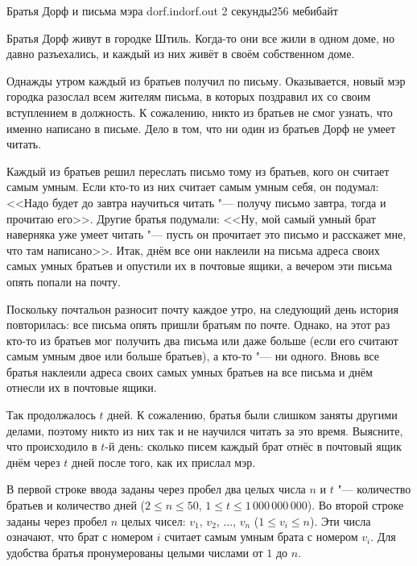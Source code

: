 \gdef\thisproblemauthor{Иван Казменко}
\gdef\thisproblemdeveloper{Иван Казменко}
\begin{problem}{Братья Дорф и письма мэра}
{dorf.in}{dorf.out}
{2 секунды}{256 мебибайт}{}

Братья Дорф живут в городке Штиль.
Когда-то они все жили в одном доме, но давно разъехались,
и каждый из них живёт в своём собственном доме.

Однажды утром каждый из братьев получил по письму.
Оказывается, новый мэр городка разослал всем жителям письма,
в которых поздравил их со своим вступлением в должность.
К сожалению, никто из братьев не смог узнать, что именно написано в письме.
Дело в том, что ни один из братьев Дорф не умеет читать.

Каждый из братьев решил переслать письмо тому из братьев,
кого он считает самым умным.
Если кто-то из них считает самым умным себя, он подумал:
<<Надо будет до завтра научиться читать "--- получу письмо завтра,
тогда и прочитаю его>>.
Другие братья подумали:
<<Ну, мой самый умный брат наверняка уже умеет читать "--- пусть он
прочитает это письмо и расскажет мне, что там написано>>.
Итак, днём все они наклеили на письма адреса своих самых умных братьев
и опустили их в почтовые ящики, а вечером эти письма опять попали на почту.

Поскольку почтальон разносит почту каждое утро, на следующий день
история повторилась: все письма опять пришли братьям по почте.
Однако, на этот раз кто-то из братьев мог получить два письма
или даже больше (если его считают самым умным двое или больше братьев),
а кто-то "--- ни одного.
Вновь все братья наклеили адреса своих самых умных братьев на все письма
и днём отнесли их в почтовые ящики.

Так продолжалось $t$ дней.
К сожалению, братья были слишком заняты другими делами, поэтому
никто из них так и не научился читать за это время.
Выясните, что происходило в $t$-й день: сколько писем каждый брат
отнёс в почтовый ящик днём через $t$ дней после того, как их прислал мэр.

\ifdefined\newpageafterlegend\newpage\fi

\InputFile

В первой строке ввода заданы через пробел два целых числа $n$ и $t$ "---
количество братьев и количество дней
($2 \le n \le 50$, $1 \le t \le 1\,000\,000\,000$).
Во второй строке заданы через пробел $n$ целых чисел:
$v_1$, $v_2$, $\ldots$, $v_n$
($1 \le v_i \le n$).
Эти числа означают, что брат с номером $i$ считает самым умным
брата с номером $v_i$.
Для удобства братья пронумерованы целыми числами от $1$ до $n$.


\end{problem}
